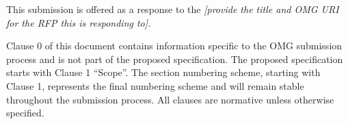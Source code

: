 This submission is offered as a response to the {\itshape \color{red} [provide the title and OMG URI for the RFP this is responding to].}

Clause 0 of this document contains information specific to the OMG submission process and is not part of the proposed 
specification. The proposed specification starts with Clause 1 ``Scope''. The section numbering scheme, starting with Clause 1, represents the final numbering scheme and will remain stable throughout the submission process. All clauses are normative unless otherwise specified. 
